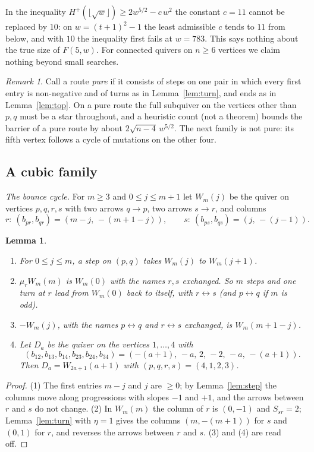\documentclass[11pt]{amsart}
\newtheorem{lemma}[theorem]{Lemma}
\theoremstyle{definition}
\theoremstyle{remark}
\newtheorem{remark}[theorem]{Remark}
\begin{document}
In the inequality $H^+(\lfloor\sqrt w\rfloor)\ge2w^{5/2}-c\,w^2$ the constant $c=11$ cannot be replaced by $10$: on $w=(t+1)^2-1$ the least admissible $c$ tends to $11$ from below, and with $10$ the inequality first fails at $w=783$. This says nothing about the true size of $F(5,w)$. For connected quivers on $n\ge6$ vertices we claim nothing beyond small searches.

\begin{remark}\label{rem:star}
Call a route \emph{pure} if it consists of steps on one pair in which every first entry is non-negative and of turns as in Lemma~\ref{lem:turn}, and ends as in Lemma~\ref{lem:top}. On a pure route the full subquiver on the vertices other than $p,q$ must be a star throughout, and a heuristic count (not a theorem) bounds the barrier of a pure route by about $2\sqrt{n-4}\,w^{5/2}$. The next family is not pure: its fifth vertex follows a cycle of mutations on the other four.
\end{remark}

\subsection{A cubic family}\label{sec:qa}
\emph{The bounce cycle.} For $m\ge3$ and $0\le j\le m+1$ let $W_m(j)$ be the quiver on vertices $p,q,r,s$ with two arrows $q\to p$, two arrows $s\to r$, and columns
\[r:\ (b_{pr},b_{qr})=(m-j,\,-(m+1-j)),\qquad s:\ (b_{ps},b_{qs})=(j,\,-(j-1)).\]

\begin{lemma}\label{lem:bounce}
\begin{enumerate}
\item For $0\le j\le m$, a step on $(p,q)$ takes $W_m(j)$ to $W_m(j+1)$.
\item $\mu_r W_m(m)$ is $W_m(0)$ with the names $r,s$ exchanged. So $m$ steps and one \emph{turn} at $r$ lead from $W_m(0)$ back to itself, with $r\leftrightarrow s$ (and $p\leftrightarrow q$ if $m$ is odd).
\item $-W_m(j)$, with the names $p\leftrightarrow q$ and $r\leftrightarrow s$ exchanged, is $W_m(m+1-j)$.
\item Let $D_a$ be the quiver on the vertices $1,\dots,4$ with
\[(b_{12},b_{13},b_{14},b_{23},b_{24},b_{34})=(-(a+1),\,-a,\,2,\,-2,\,-a,\,-(a+1)).\]
Then $D_a=W_{2a+1}(a+1)$ with $(p,q,r,s)=(4,1,2,3)$.
\end{enumerate}
\end{lemma}
\begin{proof}
(1) The first entries $m-j$ and $j$ are $\ge0$; by Lemma~\ref{lem:step} the columns move along progressions with slopes $-1$ and $+1$, and the arrows between $r$ and $s$ do not change. (2) In $W_m(m)$ the column of $r$ is $(0,-1)$ and $S_{sr}=2$; Lemma~\ref{lem:turn} with $\eta=1$ gives the columns $(m,-(m+1))$ for $s$ and $(0,1)$ for $r$, and reverses the arrows between $r$ and $s$. (3) and (4) are read off.
\end{proof}
\end{document}
